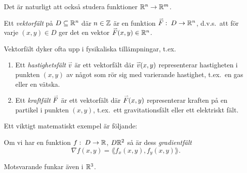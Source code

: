 \documentclass[a4paper]{article}
\begin{document}
Det är naturligt att också studera funktioner \(
    \mathbb{R}^n \to \mathbb{R}^m
\).

\begin{defn}[Vektorfält]
    Ett \emph{vektorfält} på \(
        D \subseteq \mathbb{R}^n
    \) där \(
        n \in \mathbb{Z}
    \) är en funktion \(
        \accentset{\rightharpoonup}{F} :\; D \to \mathbb{R}^n
    \), d.v.s.\ att för varje \(
        (x,y) \in D
    \) ger det en vektor \(
        \accentset{\rightharpoonup}{F} (x,y) \in \mathbb{R}^n
    \).
\end{defn}

Vektorfält dyker ofta upp i fysikaliska tillämpningar, t.ex.\ 
\begin{enumerate}
    \item Ett \emph{hastighetsfält} \(
        \accentset{\rightharpoonup}{v} 
    \) är ett vektorfält där \(
        \accentset{\rightharpoonup}{v} (x,y)
    \) representerar hastigheten i punkten \(
        (x,y)
    \) av något som rör sig med varierande hastighet, t.ex.\ en gas eller 
    en vätska. 

    \item Ett \emph{kraftfält} \(
        \accentset{\rightharpoonup}{F} 
    \) är ett vektorfält där \(
        \accentset{\rightharpoonup}{F} (x,y)
    \) representerar kraften på en partikel i punkten \(
        (x,y)
    \), t.ex.\ ett gravitationsfält eller 
    ett elektriskt fält. 
\end{enumerate}

Ett viktigt matematiskt exempel är följande:

\begin{defn}[Gradientfält]
    Om vi har en funktion \(
        f: \; D \to \mathbb{R}
    \), \(
        D \mathbb{R}^2 
    \) så är dess \emph{gradientfält} \[
        \nabla f(x,y) = \lang f_x(x,y), f_y(x,y)\rang.
    \] 

    Motsvarande funkar även i \(
        \mathbb{R}^3
    \).
\end{defn} 
\end{document}
